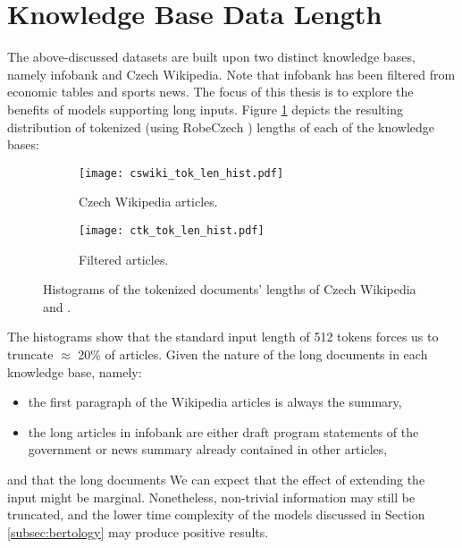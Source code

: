 \section{Knowledge Base Data Length}
\label{sec:data_length}

The above-discussed datasets are built upon two distinct knowledge bases, namely \CTK{} infobank and Czech Wikipedia.
Note that \CTK{} infobank has been filtered from economic tables and sports news.
The focus of this thesis is to explore the benefits of models supporting long inputs. 
Figure \ref{fig:len_hist} depicts the resulting distribution of tokenized (using RobeCzech \citep{robeczech}) lengths of each of the knowledge bases:
\begin{figure}[!htb]
  \centering
  \begin{subfigure}[t]{.49\textwidth}
    \texttt{[image: cswiki\_tok\_len\_hist.pdf]}
    \caption{Czech Wikipedia articles.}
  \end{subfigure}
  \hfill
  \begin{subfigure}[t]{.49\textwidth}
    \texttt{[image: ctk\_tok\_len\_hist.pdf]}
    \caption{Filtered \CTK{} articles.}
  \end{subfigure}
  \caption[Histograms of Tokenized Datasets Lengths]{Histograms of the tokenized documents' lengths of Czech Wikipedia and \CTK{}.}
  \label{fig:len_hist}
\end{figure}

The histograms show that the standard input length of 512 tokens forces us to truncate $\approx$ 20\% of articles.
Given the nature of the long documents in each knowledge base, namely:
\begin{itemize}
  \item the first paragraph of the Wikipedia articles is always the summary,
  \item the long articles in \CTK{} infobank are either draft program statements of the government or news summary already contained in other articles,
\end{itemize} and that the long documents 
We can expect that the effect of extending the input might be marginal.
Nonetheless, non-trivial information may still be truncated, and the lower time complexity of the models discussed in Section \ref{subsec:bertology} may produce positive results.

